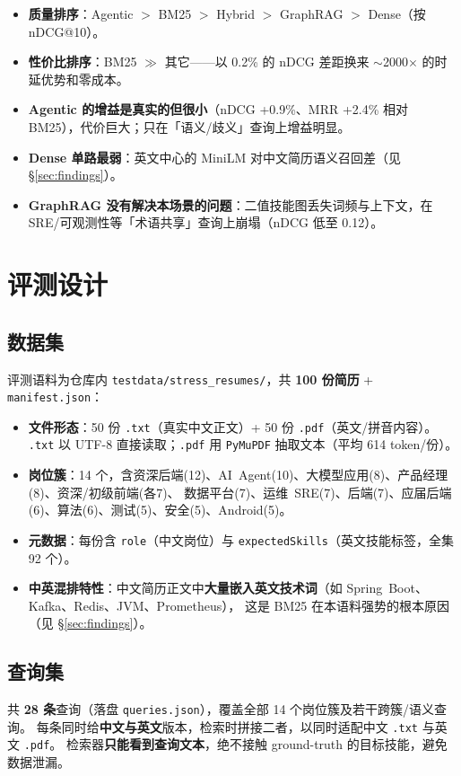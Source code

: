 \documentclass[11pt,a4paper,fontset=windows]{ctexart}
\begin{document}
\begin{itemize}
\item \textbf{质量排序}：Agentic $>$ BM25 $>$ Hybrid $>$ GraphRAG $>$ Dense（按 nDCG@10）。
\item \textbf{性价比排序}：BM25 $\gg$ 其它——以 0.2\% 的 nDCG 差距换来 $\sim$2000$\times$ 的时延优势和零成本。
\item \textbf{Agentic 的增益是真实的但很小}（nDCG +0.9\%、MRR +2.4\% 相对 BM25），代价巨大；只在「语义/歧义」查询上增益明显。
\item \textbf{Dense 单路最弱}：英文中心的 MiniLM 对中文简历语义召回差（见 \S\ref{sec:findings}）。
\item \textbf{GraphRAG 没有解决本场景的问题}：二值技能图丢失词频与上下文，在 SRE/可观测性等「术语共享」查询上崩塌（nDCG 低至 0.12）。
\end{itemize}

\section{评测设计}
\label{sec:design}

\subsection{数据集}
评测语料为仓库内 \texttt{testdata/stress\_resumes/}，共 \textbf{100 份简历} + \texttt{manifest.json}：

\begin{itemize}
\item \textbf{文件形态}：50 份 \texttt{.txt}（真实中文正文）+ 50 份 \texttt{.pdf}（英文/拼音内容）。
      \texttt{.txt} 以 UTF-8 直接读取；\texttt{.pdf} 用 \texttt{PyMuPDF} 抽取文本（平均 614 token/份）。
\item \textbf{岗位簇}：14 个，含资深后端(12)、AI~Agent(10)、大模型应用(8)、产品经理(8)、资深/初级前端(各7)、
      数据平台(7)、运维~SRE(7)、后端(7)、应届后端(6)、算法(6)、测试(5)、安全(5)、Android(5)。
\item \textbf{元数据}：每份含 \texttt{role}（中文岗位）与 \texttt{expectedSkills}（英文技能标签，全集 92 个）。
\item \textbf{中英混排特性}：中文简历正文中\textbf{大量嵌入英文技术词}（如 Spring~Boot、Kafka、Redis、JVM、Prometheus），
      这是 BM25 在本语料强势的根本原因（见 \S\ref{sec:findings}）。
\end{itemize}

\subsection{查询集}
共 \textbf{28 条}查询（落盘 \texttt{queries.json}），覆盖全部 14 个岗位簇及若干跨簇/语义查询。
每条同时给\textbf{中文与英文}版本，检索时拼接二者，以同时适配中文 \texttt{.txt} 与英文 \texttt{.pdf}。
检索器\textbf{只能看到查询文本}，绝不接触 ground-truth 的目标技能，避免数据泄漏。
\end{document}
